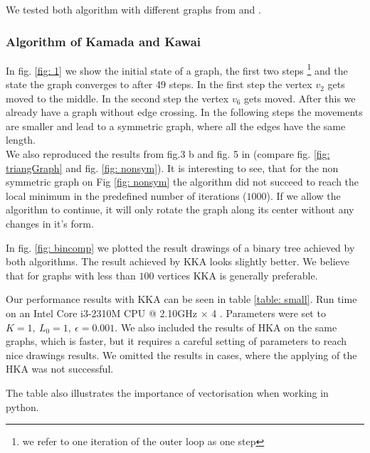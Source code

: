 \documentclass[12pt,a4paper]{article}
\begin{document}
We tested both algorithm with different graphs from \cite{TomihisaKamada1989} and \cite{DavidHarel2002}. 

\FloatBarrier 

\subsubsection*{Algorithm of Kamada and Kawai}

In fig. \ref{fig: 1} we show the initial state of a graph, the first two steps \footnote{we refer to one iteration of the outer loop as one step}  and the state the graph converges to after 49 steps. In the first step the vertex $v_2$ gets moved to the middle. In the second step the vertex $v_6$ gets moved. After this we already have a graph without edge crossing. In the following steps the movements are smaller and lead to a symmetric graph, where all the edges have the same length. \\
We also reproduced the results from fig.3 b and fig. 5 in \cite{TomihisaKamada1989} (compare fig. \ref{fig: triangGraph} and fig. \ref{fig: nonsym}). It is interesting to see, that for the non symmetric graph on Fig \ref{fig: nonsym} the algorithm did not succeed to reach the local minimum in the predefined number of iterations ($1000$). If we allow the algorithm to continue, it will only rotate the graph along its center without any changes in it's form.

In fig. \ref{fig: bincomp} we plotted the result drawings of a binary tree achieved by both algorithms. The result achieved by KKA looks slightly better. We believe that for graphs with less than $100$ vertices KKA is generally preferable.

Our performance results with KKA can be seen in table \ref{table: small}. Run time on an  Intel Core i3-2310M CPU @ 2.10GHz $\times$ 4 . Parameters were set to $K=1, \ L_0 = 1, \ \epsilon = 0.001$. %
We also included the results of HKA on the same graphs, which is faster, but it requires a careful setting of parameters to reach nice drawings results. We omitted the results in cases, where the applying of the HKA was not successful. 

The table also illustrates the importance of vectorisation when working in python.
\end{document}
